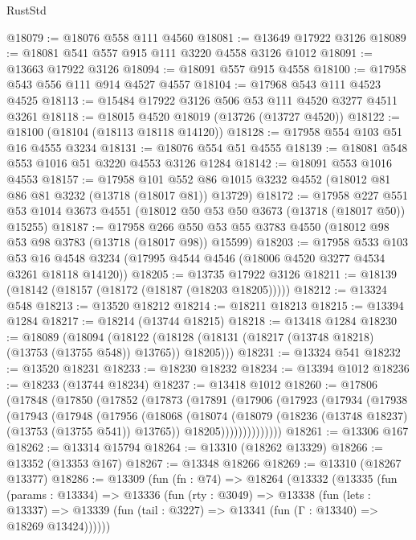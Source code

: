 \begin{lexlean}{RustStd}
\begin{coremodule}
@18079 := @18076 @558 @111 @4560
@18081 := @13649 @17922 @3126
@18089 := @18081 @541 @557 @915 @111 @3220 @4558 @3126 @1012
@18091 := @13663 @17922 @3126
@18094 := @18091 @557 @915 @4558
@18100 := @17958 @543 @556 @111 @914 @4527 @4557
@18104 := @17968 @543 @111 @4523 @4525
@18113 := @15484 @17922 @3126 @506 @53 @111 @4520 @3277 @4511 @3261
@18118 := @18015 @4520 @18019 (@13726 (@13727 @4520))
@18122 := @18100 (@18104 (@18113 @18118 @14120))
@18128 := @17958 @554 @103 @51 @16 @4555 @3234
@18131 := @18076 @554 @51 @4555
@18139 := @18081 @548 @553 @1016 @51 @3220 @4553 @3126 @1284
@18142 := @18091 @553 @1016 @4553
@18157 := @17958
    @101
    @552
    @86
    @1015
    @3232
    @4552
    (@18012 @81 @86 @81 @3232 (@13718 (@18017 @81)) @13729)
@18172 := @17958
    @227
    @551
    @53
    @1014
    @3673
    @4551
    (@18012 @50 @53 @50 @3673 (@13718 (@18017 @50)) @15255)
@18187 := @17958
    @266
    @550
    @53
    @55
    @3783
    @4550
    (@18012 @98 @53 @98 @3783 (@13718 (@18017 @98)) @15599)
@18203 := @17958
    @533
    @103
    @53
    @16
    @4548
    @3234
    (@17995 @4544 @4546 (@18006 @4520 @3277 @4534 @3261 @18118 @14120))
@18205 := @13735 @17922 @3126
@18211 := @18139 (@18142 (@18157 (@18172 (@18187 (@18203 @18205)))))
@18212 := @13324 @548
@18213 := @13520 @18212
@18214 := @18211 @18213
@18215 := @13394 @1284
@18217 := @18214 (@13744 @18215)
@18218 := @13418 @1284
@18230 := @18089
    (@18094
      (@18122 (@18128 (@18131 (@18217 (@13748 @18218) (@13753 (@13755 @548)) @13765)) @18205)))
@18231 := @13324 @541
@18232 := @13520 @18231
@18233 := @18230 @18232
@18234 := @13394 @1012
@18236 := @18233 (@13744 @18234)
@18237 := @13418 @1012
@18260 := @17806
    (@17848
      (@17850
        (@17852
          (@17873
            (@17891
              (@17906
                (@17923
                  (@17934
                    (@17938
                      (@17943
                        (@17948
                          (@17956
                            (@18068
                              (@18074
                                (@18079 (@18236 (@13748 @18237) (@13753 (@13755 @541)) @13765))
                                @18205))))))))))))))
@18261 := @13306 @167
@18262 := @13314 @15794
@18264 := @13310 (@18262 @13329)
@18266 := @13352 (@13353 @167)
@18267 := @13348 @18266
@18269 := @13310 (@18267 @13377)
@18286 := @13309
    (fun (fn : @74) =>
    @18264
      (@13332
        (@13335
          (fun (params : @13334) =>
          @13336
            (fun (rty : @3049) =>
            @13338
              (fun (lets : @13337) =>
              @13339 (fun (tail : @3227) => @13341 (fun (Γ : @13340) => @18269 @13424))))))

\end{coremodule}
\end{lexlean}
